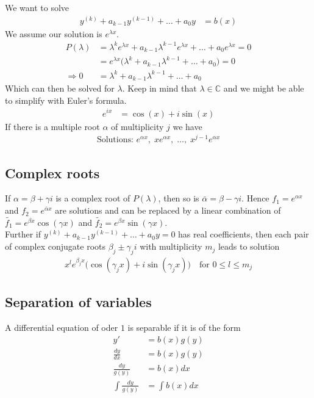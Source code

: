 \documentclass[8pt]{extarticle}
\newcommand{\C}{{\mathbb C}}
\begin{document}
\begin{multicols*}{3}
  We want to solve
  \begin{align*}
    y^{(k)} + a_{k-1}y^{(k-1)} + \dots + a_0 y & = b(x)
  \end{align*}
  We assume our solution is $e^{\lambda x}$.
  \begin{align*}
    P(\lambda)    & = \lambda^k e^{\lambda x} + a_{k-1} \lambda^{k-1} e^{\lambda x} + \dots + a_0 e^{\lambda x} = 0 \\
                  & = e^{\lambda x} \Big( \lambda^k + a_{k-1}\lambda^{k-1} + \dots + a_0 \Big) = 0                  \\
    \Rightarrow 0 & = \lambda^k + a_{k-1}\lambda^{k-1} + \dots + a_0
  \end{align*}
  Which can then be solved for $\lambda$. Keep in mind that
  $\lambda \in \C$ and we might be able to simplify
  with Euler's formula.
  \begin{align*}
    e^{i x} & = \cos(x) + i \sin(x)
  \end{align*}
  If there is a multiple root $\alpha$ of multiplicity $j$ we have
  \begin{align*}
    \text{Solutions: }e^{\alpha x},\; x e^{\alpha x},\; \dots,\; x^{j-1} e^{\alpha x}
  \end{align*}
  \subsection{Complex roots}
  If $\alpha = \beta + \gamma i$ is a complex root of $P(\lambda)$, then so
  is $\bar{\alpha} = \beta - \gamma i$. Hence $f_1 = e^{\alpha x}$ and
  $f_2 = e^{\bar{\alpha} x}$ are solutions and can be replaced
  by a linear combination of $\tilde{f_1} = e^{\beta x} \cos(\gamma x)$
  and $\tilde{f_2} = e^{\beta x} \sin(\gamma x)$.\\
  Further if $y^{(k)} + a_{k-1}y^{(k-1)} + \dots + a_0 y = 0$ has
  real coefficients, then each pair of complex conjugate roots
  $\beta_j \pm \gamma_j i$ with multiplicity $m_j$ leads to
  solution
  \begin{align*}
    x^l e^{\beta_j x} \Big( \cos(\gamma_j x) + i \sin(\gamma_j x) \Big)
    \quad \text{for }0 \leq l \leq m_j
  \end{align*}
  \subsection{Separation of variables}
  A differential equation of oder $1$ is separable if it is of the
  form
  \begin{align*}
    y'                   & = b(x) g(y)    \\
    \frac{dy}{dx}        & = b(x) g(y)    \\
    \frac{dy}{g(y)}      & = b(x) dx      \\
    \int \frac{dy}{g(y)} & = \int b(x) dx 
  \end{align*}

\end{multicols*}
\end{document}
